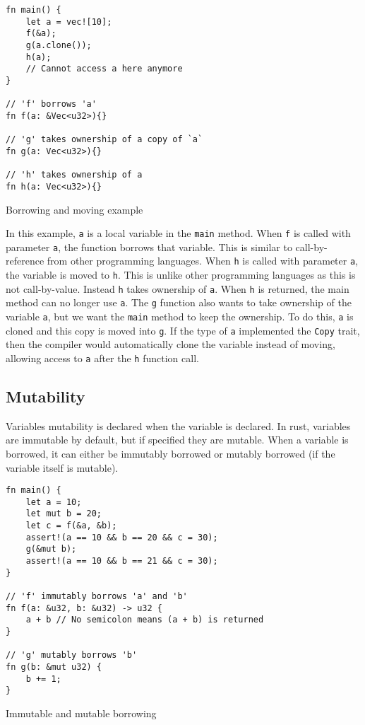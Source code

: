 \begin{code}
\begin{verbatim}
fn main() {
    let a = vec![10];
    f(&a);
    g(a.clone());
    h(a);
    // Cannot access a here anymore
}

// 'f' borrows 'a'
fn f(a: &Vec<u32>){}

// 'g' takes ownership of a copy of `a`
fn g(a: Vec<u32>){}

// 'h' takes ownership of a
fn h(a: Vec<u32>){}
\end{verbatim}
\caption{Borrowing and moving example}
\end{code}

In this example, \texttt{a} is a local variable in the \texttt{main} method.
When \texttt{f} is called with parameter \texttt{a}, the function borrows that variable. This is similar to call-by-reference from other programming languages.
When \texttt{h} is called with parameter \texttt{a}, the variable is moved to \texttt{h}. This is unlike other programming languages as this is not call-by-value. Instead \texttt{h} takes ownership of \texttt{a}. When \texttt{h} is returned, the main method can no longer use \texttt{a}.
The \texttt{g} function also wants to take ownership of the variable \texttt{a}, but we want the \texttt{main} method to keep the ownership. To do this, \texttt{a} is cloned and this copy is moved into \texttt{g}. If the type of \texttt{a} implemented the \texttt{Copy} trait, then the compiler would automatically clone the variable instead of moving, allowing access to \texttt{a} after the \texttt{h} function call.

\subsection{Mutability}
Variables mutability is declared when the variable is declared. In rust, variables are immutable by default, but if specified they are mutable. When a variable is borrowed, it can either be immutably borrowed or mutably borrowed (if the variable itself is mutable).

\begin{code}
\begin{verbatim}
fn main() {
    let a = 10;
    let mut b = 20;
    let c = f(&a, &b);
    assert!(a == 10 && b == 20 && c = 30);
    g(&mut b);
    assert!(a == 10 && b == 21 && c = 30);
}

// 'f' immutably borrows 'a' and 'b'
fn f(a: &u32, b: &u32) -> u32 {
    a + b // No semicolon means (a + b) is returned
}

// 'g' mutably borrows 'b'
fn g(b: &mut u32) {
    b += 1;
}
\end{verbatim}
\caption{Immutable and mutable borrowing}
\end{code}


